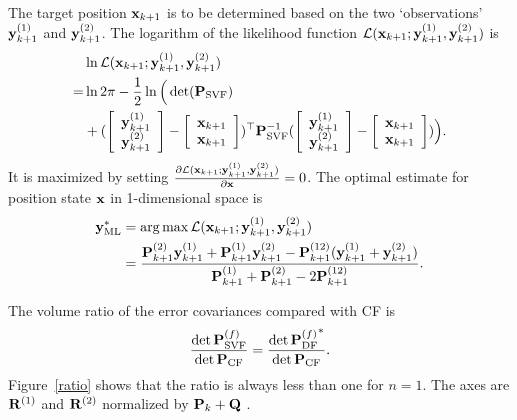 The target position ${\bf x}_{k+1}$ is to be determined based on the two `observations' ${\bf y}^{(1)}_{k+1}$ and ${\bf y}^{(2)}_{k+1}$. The logarithm of the likelihood function $\mathcal{L}({\bf x}_{k+1};{\bf y}^{(1)}_{k+1},{\bf y}^{(2)}_{k+1})$ is
\begin{equation}
\begin{split}
&\ln\mathcal{L}({\bf x}_{k+1};{\bf y}^{(1)}_{k+1},{\bf y}^{(2)}_{k+1})\\
= &\ln 2\pi-\frac{1}{2}\ln\Big(\det({\bf P}_\text{SVF}) \\
&+(\left[                                                \begin{array}{c}
{\bf y}^{(1)}_{k+1} \\
{\bf y}^{(2)}_{k+1} \\\end{array}\right]-\left[\begin{array}{c}
 {\bf x}_{k+1} \\
 {\bf x}_{k+1} \\\end{array}\right]
)^\top{\bf P}_{\text{SVF}}^{-1}(\left[
  \begin{array}{c}
{\bf y}^{(1)}_{k+1} \\
{\bf y}^{(2)}_{k+1} \\
\end{array}\right]-\left[
           \begin{array}{c}
           {\bf x}_{k+1} \\
           {\bf x}_{k+1} \\\end{array}\right])\Big).
\end{split}
\end{equation}
It is maximized by setting $\frac{\partial\mathcal{L}({\bf x}_{k+1};{\bf y}^{(1)}_{k+1},{\bf y}^{(2)}_{k+1})}{\partial{\bf x}}=0$. The optimal estimate for position state $\bf x$ in 1-dimensional space is
\begin{equation}
\begin{split}
{\bf y}^*_\text{ML}&=\arg\max\mathcal{L}({\bf x}_{k+1};{\bf y}^{(1)}_{k+1},{\bf y}^{(2)}_{k+1})\\
&=\frac{{\bf P}^{(2)}_{k+1}{\bf y}^{(1)}_{k+1}+{\bf P}^{(1)}_{k+1}{\bf y}^{(2)}_{k+1}-{\bf P}^{(12)}_{k+1}({\bf y}^{(1)}_{k+1}+{\bf y}^{(2)}_{k+1})}{{\bf P}^{(1)}_{k+1}+{\bf P}^{(2)}_{k+1}-2{\bf P}^{(12)}_{k+1}}.
\end{split}
\end{equation}

The volume ratio of the error covariances compared with CF is
\begin{equation}
\frac{\det{\bf P}^{(f)}_{\text{SVF}}}{\det{\bf P}_\text{CF}}=\frac{\det{{{\bf P}^{(f)}_{\text{DF}}}^*}}{\det{\bf P}_\text{CF}}.
\end{equation}
Figure~\ref{ratio} shows that the ratio is always less than one for $n=1$. The axes are ${\bf R}^{(1)}$ and ${\bf R}^{(2)}$ normalized by ${\bf P}_k+{\bf Q}$ .

